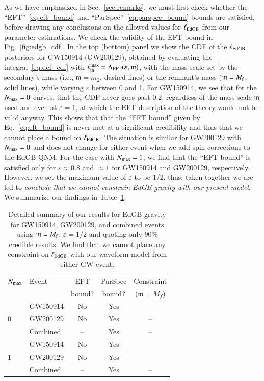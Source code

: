 \documentclass[twocolumn,
               prd,
               aps,
               superscriptaddress,
               tightenlines,
               nofootinbib,
               eqsecnum,
               amsfonts,
               amsmath,
               longbibliography]{revtex4-1}
\newcommand{\gm}{\mathfrak{m}}
\begin{document}
As we have emphasized in Sec.~\ref{sec:remarks}, we must first check whether the
``EFT''~\eqref{eq:eft_bound} and ``ParSpec''~\eqref{eq:parspec_bound} bounds
are satisfied, before drawing any conclusions on the allowed values for
$\ell_{\rm EdGB}$ from our parameter estimations.
%
We check the validity of the EFT bound in Fig.~\ref{fig:edgb_cdf}. In the top (bottom) panel we show
the CDF of the $\ell_{\rm EdGB}$ posteriors for GW150914 (GW200129), obtained
by evaluating the integral~\eqref{eq:def_cdf} with $\ell^{\rm max}_{\rm th} = \Lambda_{\rm EFT}(\varepsilon, \mathfrak{m})$,
with the mass scale set by the secondary's mass (i.e., $\mathfrak{m} = m_2$, dashed lines) or
the remnant's mass ($\mathfrak{m} = M_{\rm f}$, solid lines), while varying $\varepsilon$ between 0 and 1.
%
For GW150914, we see that for the $N_{\rm max} = 0$ curves, that the CDF never goes
past $0.2$, regardless of the mass scale $\mathfrak{m}$ used and even at $\varepsilon =
1$, at which the EFT description of the theory would not be valid anyway.
%
This shows that that the ``EFT bound'' given by Eq.~\eqref{eq:eft_bound} is
never met at a significant credibility and thus that we cannot place a bound on
$\ell_{\rm EdGB}$.
%
The situation is similar for GW200129 with $N_{\rm max} = 0$ and does not
change for either event when we add spin corrections to the EdGB QNM.
%
For the case with $N_{\rm max} = 1$, we find that the ``EFT bound'' is satisfied
only for $\varepsilon \approx 0.8$ and $\approx1$ for GW150914 and GW200129, respectively.
However, we set the maximum value of $\varepsilon$ to be 1/2, thus,
taken together we are led to \emph{conclude that we cannot constrain EdGB gravity with our
present model}.
%
We summarize our findings in Table~\ref{tab:summary_edgb}.

\begin{table}[h]
\begin{tabular}{l l c c c}
\hline
\hline
$N_{\rm max}$ & Event &  EFT    & ParSpec & Constraint      \\
              &       &  bound? & bound?  & ($\gm = M_{f}$) \\
\hline
  & GW150914 & No  & Yes & -- \\
0 & GW200129 & No  & Yes & -- \\
  & Combined & --  & Yes & -- \\
\hline
  & GW150914 & No  & Yes & -- \\
1 & GW200129 & No  & Yes & -- \\
  & Combined & --  & Yes & -- \\
\hline
\hline
\end{tabular}
\caption{Detailed summary of our results for EdGB gravity for GW150914, GW200129, and
combined events using $\gm = M_{\rm f}$, $\varepsilon = 1/2$ and quoting only 90\% credible results.
%
We find that we cannot place any constraint on $\ell_{\rm EdGB}$ with our waveform model from either GW event.
}
\label{tab:summary_edgb}
\end{table}
\end{document}
